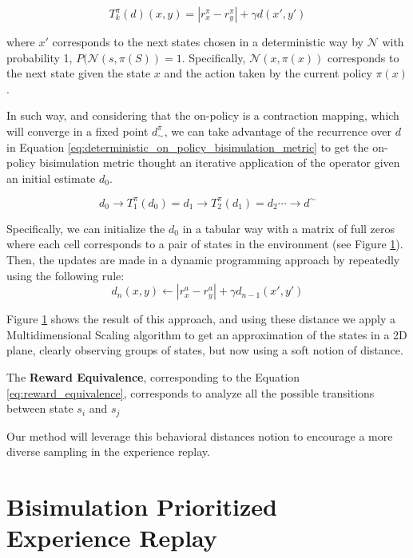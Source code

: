 \begin{equation}
    \label{eq:deterministic_on_policy_bisimulation_metric}
    T^\pi_k(d)(x, y) = |r^\pi_x - r^\pi_{y}| + \gamma d(x',y') 
\end{equation}

where $x'$ corresponds to the next states chosen in a deterministic way by $\mathcal{N}$ with probability 1, $P(\mathcal{N}(s,\pi(S)) = 1$. Specifically, $\mathcal{N}(x,\pi(x))$ corresponds to the next state given the state $x$ and the action taken by the current policy $\pi(x)$.

In such way, and considering that the on-policy is a contraction mapping, which will converge in a fixed point $d^\pi_\sim$, we can take advantage of the recurrence over $d$ in Equation \ref{eq:deterministic_on_policy_bisimulation_metric} to get the on-policy bisimulation metric thought an iterative application of the operator given an initial estimate $d_0$.

$$d_0 \rightarrow T^\pi_1(d_0) = d_1 \rightarrow T^\pi_2(d_1) = d_2 \cdots \rightarrow d^\sim$$

Specifically, we can initialize the $d_0$ in a tabular way with a matrix of full zeros where each cell corresponds to a pair of states in the environment (see Figure \ref{}). Then, the updates are made in a dynamic programming approach by repeatedly using the following rule:
\begin{equation}
    d_n(x,y) \leftarrow |r_x^a - r_y^a | + \gamma d_{n-1}(x',y')
\end{equation}

Figure \ref{} shows the result of this approach, and using these distance we apply a Multidimensional Scaling algorithm to get an approximation of the states in a 2D plane, clearly observing groups of states, but now using a soft notion of distance.


The \textbf{Reward Equivalence}, corresponding to the Equation \ref{eq:reward_equivalence}, corresponds to analyze all the possible transitions between state $s_i$ and $s_j$

Our method will leverage this behavioral distances notion to encourage a more diverse sampling in the experience replay.

\section{Bisimulation Prioritized Experience Replay}

